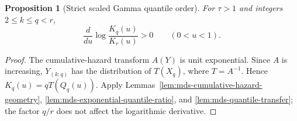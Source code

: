 \documentclass[11pt]{article}
\newtheorem{proposition}[theorem]{Proposition}
\theoremstyle{definition}
\theoremstyle{remark}
\newcommand{\1}{\mathbf 1}
\begin{document}
\begin{proposition}[Strict scaled Gamma quantile order]
\label{prop:mds-gamma-quantile-order}
For \(\tau>1\) and integers \(2\le k\le q<r\),
\begin{equation}\label{eq:mds-gamma-quantile-order}
 \frac{d}{du}\log\frac{K_q(u)}{K_r(u)}>0
 \qquad(0<u<1).
\end{equation}
\end{proposition}
\begin{proof}
The cumulative-hazard transform \(A(Y)\) is unit exponential.
Since \(A\) is increasing, \(Y_{(k:q)}\) has the distribution of
\(T(X_q)\), where \(T=A^{-1}\). Hence \(K_q(u)=qT(Q_q(u))\).
Apply Lemmas~\ref{lem:mds-cumulative-hazard-geometry},
\ref{lem:mds-exponential-quantile-ratio}, and
\ref{lem:mds-quantile-transfer}; the factor \(q/r\) does not affect
the logarithmic derivative.
\end{proof}
\end{document}

